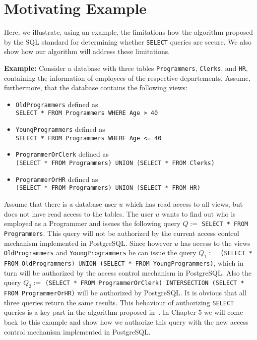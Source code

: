 \section{Motivating Example}


Here, we illustrate, using an example, the limitations how the algorithm proposed by the SQL standard for determining whether \texttt{SELECT} queries are secure.
%
We also show how our algorithm will address these limitations.


\smallskip
\noindent
{\bf Example:}
%
Consider a database with three tables \texttt{Programmers}, \texttt{Clerks}, and \texttt{HR}, containing the information of employees of the respective departements.
%
Assume, furthermore, that the database contains the following views:
\begin{itemize}
	\item \texttt{OldProgrammers} defined as \\ \texttt{SELECT * FROM Programmers WHERE Age > 40}
	\item \texttt{YoungProgrammers} defined as \\ \texttt{SELECT * FROM Programmers WHERE Age <= 40}
	\item \texttt{ProgrammerOrClerk} defined as \\ \texttt{(SELECT * FROM Programmers) UNION (SELECT * FROM Clerks)}
	\item \texttt{ProgrammerOrHR} defined as \\ \texttt{(SELECT * FROM Programmers) UNION (SELECT * FROM HR)}
\end{itemize}
%
Assume that there is a database user $u$ which has read access to all views, but does not have read access to the tables.
%
The user $u$ wants to find out who is employed as a Programmer and issues the following query $Q := $ \texttt{SELECT * FROM Programmers}. 
%
This query will not be authorized by the current access control mechanism implemented in PostgreSQL.
%
Since however $u$ has access to the views \texttt{OldProgrammers} and \texttt{YoungProgrammers} he can issue the query $Q_1 := $ \texttt{(SELECT * FROM OldProgrammers) UNION (SELECT * FROM YoungProgrammers)}, which in turn will be authorized by the access control mechanism in PostgreSQL.
%
Also the query $Q_2 := $ \texttt{(SELECT * FROM ProgrammerOrClerk) INTERSECTION (SELECT * FROM ProgrammerOrHR)} will be authorized by PostgreSQL.
%
It is obvious that all three queries return the same results.
%
This behaviour of authorizing \texttt{SELECT} queries is a key part in the algorithm proposed in~\cite{guarnieri2016strong}.
%
In Chapter 5 we will come back to this example and show how we authorize this query with the new access control mechanism implemented in PostgreSQL.
